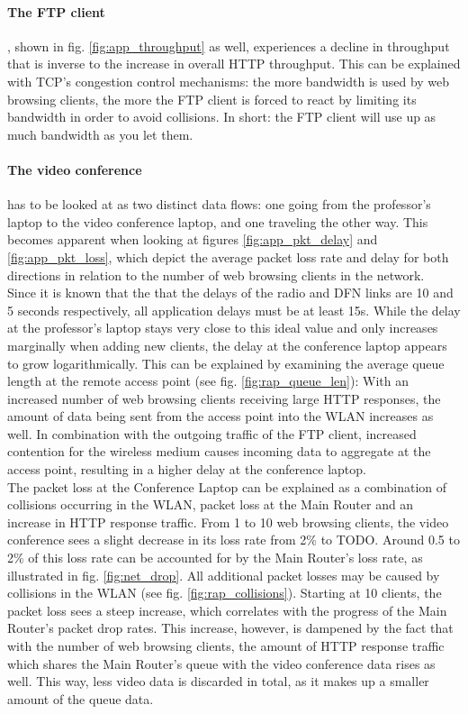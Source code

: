 \documentclass[
10pt, %
a4paper, %
oneside, %
headinclude,footinclude, %
BCOR5mm, %
]{scrartcl}
\begin{document}
\paragraph{The FTP client}, shown in fig. \ref{fig:app_throughput} as well, experiences a %
decline in throughput that is inverse to the increase in overall HTTP throughput. This can be explained with TCP's congestion control mechanisms: the more bandwidth is used by web browsing clients, the more the FTP client is forced to react by limiting its bandwidth in order to avoid collisions. In short: the FTP client will use up as much bandwidth as you let them.

\paragraph{The video conference} has to be looked at as two distinct data flows: one going from the professor's laptop to the video conference laptop, and one traveling the other way. This becomes apparent when looking at figures \ref{fig:app_pkt_delay} and \ref{fig:app_pkt_loss}, which depict the average packet loss rate and delay for both directions in relation to the number of web browsing clients in the network.\\
Since it is known that the that the delays of the radio and DFN links are 10 and 5 seconds respectively, all application delays must be at least 15s. While the delay at the professor's laptop stays very close to this ideal value and only increases marginally when adding new clients, the delay at the conference laptop appears to grow logarithmically. This can be explained by examining the average queue length at the remote access point (see fig. \ref{fig:rap_queue_len}): With an increased number of web browsing clients receiving large HTTP responses, the amount of data being sent from the access point into the WLAN increases as well. In combination with the outgoing traffic of the FTP client, increased contention for the wireless medium causes incoming data to aggregate at the access point, resulting in a higher delay at the conference laptop.\\
The packet loss at the Conference Laptop can be explained as a combination of collisions occurring in the WLAN, packet loss at the Main Router and an increase in HTTP response traffic. From 1 to 10 web browsing clients, the video conference sees a slight decrease in its loss rate from 2\% to TODO. Around 0.5 to 2\% of this loss rate can be accounted for by the Main Router's loss rate, as illustrated in fig. \ref{fig:net_drop}. All additional packet losses may be caused by collisions in the WLAN (see fig. \ref{fig:rap_collisions}). Starting at 10 clients, the packet loss sees a steep increase, which correlates with the progress of the Main Router's packet drop rates. This increase, however, is dampened by the fact that with the number of web browsing clients, the amount of HTTP response traffic which shares the Main Router's queue with the video conference data rises as well. This way, less video data is discarded in total, as it makes up a smaller amount of the queue data.
\end{document}
